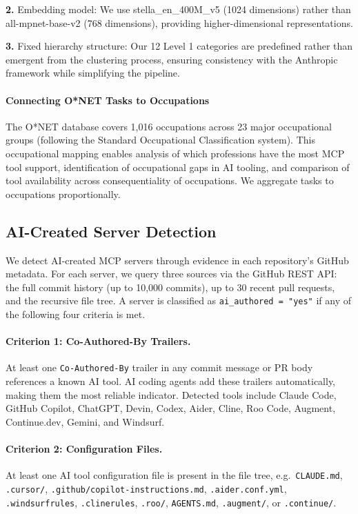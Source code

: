 \documentclass[manuscript,screen,nonacm,oneside]{acmart}
\begin{document}
\textbf{2.} Embedding model: We use stella\_en\_400M\_v5 (1024 dimensions) rather than all-mpnet-base-v2 (768 dimensions), providing higher-dimensional representations.

\textbf{3.} Fixed hierarchy structure: Our 12 Level 1 categories are predefined rather than emergent from the clustering process, ensuring consistency with the Anthropic framework while simplifying the pipeline.

\paragraph{Connecting O*NET Tasks to Occupations}\label{connecting-onet-tasks-to-occupations}

The O*NET database covers 1,016 occupations across 23 major occupational groups (following the Standard Occupational Classification system). This occupational mapping enables analysis of which professions have the most MCP tool support, identification of occupational gaps in AI tooling, and comparison of tool availability across consequentiality of occupations. We aggregate tasks to occupations proportionally.

\subsection{AI-Created Server Detection}
\label{app:ai-detection}

We detect AI-created MCP servers through evidence in each repository's GitHub metadata. For each server, we query three sources via the GitHub REST API: the full commit history (up to 10,000 commits), up to 30 recent pull requests, and the recursive file tree. A server is classified as \texttt{ai\_authored = "yes"} if any of the following four criteria is met.

\paragraph{Criterion 1: Co-Authored-By Trailers.}
At least one \texttt{Co-Authored-By} trailer in any commit message or PR body references a known AI tool. AI coding agents add these trailers automatically, making them the most reliable indicator. Detected tools include Claude Code, GitHub Copilot, ChatGPT, Devin, Codex, Aider, Cline, Roo Code, Augment, Continue.dev, Gemini, and Windsurf.

\paragraph{Criterion 2: Configuration Files.}
At least one AI tool configuration file is present in the file tree, e.g.\ \texttt{CLAUDE.md}, \texttt{.cursor/}, \texttt{.github/copilot-instructions.md},
\texttt{.aider.conf.yml}, \texttt{.windsurfrules}, \texttt{.clinerules}, \texttt{.roo/}, \texttt{AGENTS.md}, \texttt{.augment/}, or \texttt{.continue/}.
\end{document}
